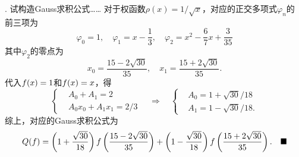 \vspace{1cm}
\par{}. 试构造Gauss求积公式……
\ans
  对于权函数$\rho(x) = 1/\sqrt{x}$，对应的正交多项式$\varphi_n$的
  前三项为
  \[
    \varphi_0 = 1,\quad \varphi_1 = x-\frac{1}{3},\quad
    \varphi_2 = x^2 - \frac{6}{7}x + \frac{3}{35}
  \]
  其中$\varphi_2$的零点为
  \[
    x_0 = \frac{15-2\sqrt{30}}{35},\quad
    x_1 = \frac{15+2\sqrt{30}}{35}.
  \]
  代入$\mathnormal{f}(x) = 1$和$\mathnormal{f}(x) = x$，得
  \[
  \begin{cases}
    & A_0 + A_1 = 2 \\
    & A_0x_0 + A_1x_1 = 2/3
  \end{cases}
  \quad\Rightarrow\quad
  \begin{cases}
    & A_0 = 1 + \sqrt{30}/18 \\
    & A_1 = 1 - \sqrt{30}/18.
  \end{cases}
  \]
  综上，对应的Gauss求积公式为
  \[
    Q(\mathnormal{f}) = \left( 1+\frac{\sqrt{30}}{18} \right)\mathnormal{f}\left(\frac{15-2\sqrt{30}}{35}\right)
    + \left(1 - \frac{\sqrt{30}}{18} \right) \mathnormal{f}\left(\frac{15+2\sqrt{30}}{35}\right).
    \quad\blacksquare
  \]


